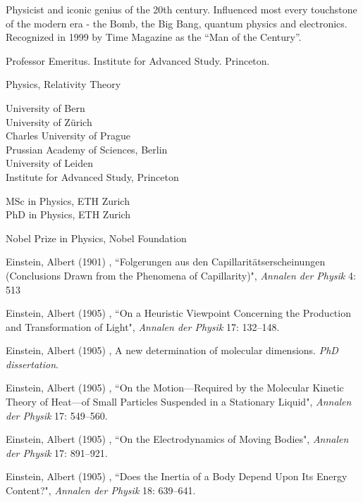 \documentclass{xetexCV}
\begin{document}
\makecvtitle

Physicist and iconic genius of the 20th century.  Influenced most every touchstone of the modern era - the Bomb, the Big Bang, quantum physics and electronics.  Recognized in 1999 by Time Magazine as the ``Man of the Century''.

Professor Emeritus.  Institute for Advanced Study. Princeton.

Physics, Relativity Theory

University of Bern  \\
University of Zürich  \\
Charles University of Prague  \\
Prussian Academy of Sciences, Berlin  \\
University of Leiden  \\
Institute for Advanced Study, Princeton 

MSc in Physics, ETH Zurich  \\
PhD in Physics, ETH Zurich  

Nobel Prize in Physics, Nobel Foundation  

\pagebreak

Einstein, Albert (1901) , “Folgerungen aus den Capillaritätserscheinungen (Conclusions Drawn from the Phenomena of Capillarity)", \emph{Annalen der Physik} 4: 513\medskip

Einstein, Albert (1905) , “On a Heuristic Viewpoint Concerning the Production and Transformation of Light", \emph{Annalen der Physik} 17: 132–148.\medskip

Einstein, Albert (1905) , A new determination of molecular dimensions. \emph{PhD dissertation}.\medskip

Einstein, Albert (1905) , “On the Motion—Required by the Molecular Kinetic Theory of Heat—of Small Particles Suspended in a Stationary Liquid", \emph{Annalen der Physik} 17: 549–560.\medskip

Einstein, Albert (1905) , “On the Electrodynamics of Moving Bodies", \emph{Annalen der Physik} 17: 891–921.\medskip

Einstein, Albert (1905) , “Does the Inertia of a Body Depend Upon Its Energy Content?", \emph{Annalen der Physik} 18: 639–641.\medskip
\end{document}

